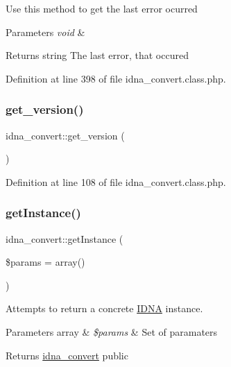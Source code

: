 Use this method to get the last error ocurred 
\begin{DoxyParams}{Parameters}
{\em void} & \\
\hline
\end{DoxyParams}
\begin{DoxyReturn}{Returns}
string The last error, that occured 
\end{DoxyReturn}


Definition at line 398 of file idna\+\_\+convert.\+class.\+php.

\mbox{\label{classidna__convert_a59d30af851a16b87ac00a96931fe7e61}} 
\subsubsection{\texorpdfstring{get\+\_\+version()}{get\_version()}}
{\footnotesize\ttfamily idna\+\_\+convert\+::get\+\_\+version (\begin{DoxyParamCaption}{ }\end{DoxyParamCaption})}



Definition at line 108 of file idna\+\_\+convert.\+class.\+php.

\mbox{\label{classidna__convert_aff2ec039994038d13c8000addff58de3}} 
\subsubsection{\texorpdfstring{get\+Instance()}{getInstance()}}
{\footnotesize\ttfamily idna\+\_\+convert\+::get\+Instance (\begin{DoxyParamCaption}\item[{}]{\$params = {\ttfamily array()} }\end{DoxyParamCaption})}

Attempts to return a concrete \hyperlink{namespaceIDNA}{I\+D\+NA} instance.


\begin{DoxyParams}[1]{Parameters}
array & {\em \$params} & Set of paramaters \\
\hline
\end{DoxyParams}
\begin{DoxyReturn}{Returns}
\hyperlink{classidna__convert}{idna\+\_\+convert}  public 
\end{DoxyReturn}


